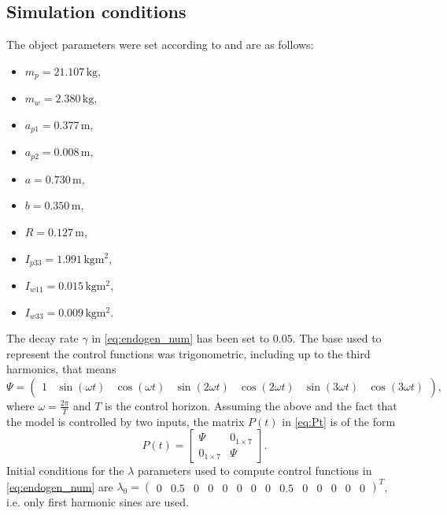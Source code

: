 \subsection{Simulation conditions}
The object parameters were set according to \cite{coupled} and are as follows:
\begin{multicols}{2}
\begin{itemize}
\item $m_p = 21.107\,\mathrm{kg}$,
\item $m_w = 2.380\,\mathrm{kg}$,
\item $a_{p1} = 0.377\,\mathrm{m}$,
\item $a_{p2} = 0.008\,\mathrm{m}$,
\item $a = 0.730\,\mathrm{m}$,
\item $b = 0.350\,\mathrm{m}$,
\item $R = 0.127\,\mathrm{m}$,
\item $I_{p33} = 1.991\,\mathrm{kgm^2}$,
\item $I_{w11} = 0.015\,\mathrm{kgm^2}$,
\item $I_{w33} = 0.009\,\mathrm{kgm^2}$.
\end{itemize}
\end{multicols}
The decay rate $\gamma$ in \eqref{eq:endogen_num} has been set to $0.05$.
The base used to represent the control functions was trigonometric, including up to the third harmonics, that means
\begin{equation}
\Psi=\begin{pmatrix}
1 & \sin(\omega t) & \cos(\omega t)& \sin(2\omega t) & \cos(2\omega t)& \sin(3\omega t) & \cos(3\omega t)
\end{pmatrix},
\end{equation}
where $\omega=\frac{2\pi}{T}$ and $T$ is the control horizon. Assuming the above and the fact that the model is controlled by two inputs, the matrix $P(t)$ in \eqref{eq:Pt} is of the form
\begin{equation}
P(t)=\begin{bmatrix}
\Psi & 0_{1\times 7}\\
0_{1\times 7} & \Psi
\end{bmatrix}.
\end{equation}
\setcounter{MaxMatrixCols}{14}
Initial conditions for the $\lambda$ parameters used to compute control functions in \eqref{eq:endogen_num} are $\lambda_0= \begin{pmatrix}
0 & 0.5 & 0 & 0 & 0 & 0 & 0 & 0 & 0.5 & 0 & 0 & 0 & 0 & 0
\end{pmatrix} ^T$, i.e. only first harmonic sines are used.
 	

